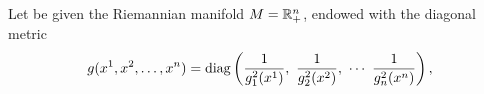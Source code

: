 Let be given the Riemannian manifold $M=\mathbb R_+^n$, endowed with the
diagonal metric
\begin{equation}\label{e2}
g(x^1, x^2,\ldots,x^n)={\rm diag}\left(\displaystyle{1\over g_1^2(x^1)}, ~ \displaystyle{1\over g_2^2(x^2)},~\cdots~ \displaystyle{1\over g_n^2(x^n)}\right),
\end{equation}
